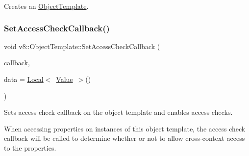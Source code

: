 Creates an \mbox{\hyperlink{classv8_1_1ObjectTemplate}{Object\+Template}}. \mbox{\label{classv8_1_1ObjectTemplate_a5b0337016cd89fc72f3a9d75399c2487}} 
\subsubsection{\texorpdfstring{Set\+Access\+Check\+Callback()}{SetAccessCheckCallback()}}
{\footnotesize\ttfamily void v8\+::\+Object\+Template\+::\+Set\+Access\+Check\+Callback (\begin{DoxyParamCaption}\item[{\mbox{\hyperlink{namespacev8_a1024fb358d107c1494163217830688e6}{Access\+Check\+Callback}}}]{callback,  }\item[{\mbox{\hyperlink{classv8_1_1Local}{Local}}$<$ \mbox{\hyperlink{classv8_1_1Value}{Value}} $>$}]{data = {\ttfamily \mbox{\hyperlink{classv8_1_1Local}{Local}}$<$~\mbox{\hyperlink{classv8_1_1Value}{Value}}~$>$()} }\end{DoxyParamCaption})}

Sets access check callback on the object template and enables access checks.

When accessing properties on instances of this object template, the access check callback will be called to determine whether or not to allow cross-\/context access to the properties. \mbox{\label{classv8_1_1ObjectTemplate_abb8302671bfb5d381f7415336f4e631d}} 
